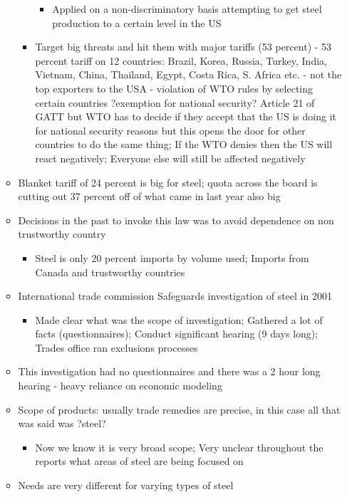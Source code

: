\documentclass[10pt]{article}
\begin{document}
\begin{itemize}
\begin{itemize}
\begin{itemize}
\begin{itemize}
  \item Applied on a non-discriminatory basis attempting to get steel production to a certain level in the US
\end{itemize}
\item Target big threats and hit them with major tariffs (53 percent) - 53 percent tariff on 12 countries: Brazil, Korea, Russia, Turkey, India, Vietnam, China, Thailand, Egypt, Costa Rica, S. Africa etc. - not the top exporters to the USA - violation of WTO rules by selecting certain countries ?exemption for national security? Article 21 of GATT but WTO has to decide if they accept that the US is doing it for national security reasons but this opens the door for other countries to do the same thing; If the WTO denies then the US will react negatively; Everyone else will still be affected negatively  
\end{itemize}  
  \item Blanket tariff of 24 percent is big for steel; quota across the board is cutting out 37 percent off of what came in last year also big
  \item Decisions in the past to invoke this law was to avoid dependence on non trustworthy country
  \begin{itemize}
    \item Steel is only 20 percent imports by volume used; Imports from Canada and trustworthy countries
  \end{itemize}
  \item International trade commission Safeguards investigation of steel in 2001 
\begin{itemize}
  \item Made clear what was the scope of investigation; Gathered a lot of facts (questionnaires); Conduct significant hearing (9 days long); Trades office ran exclusions processes
\end{itemize}
  \item This investigation had no questionnaires and there was a 2 hour long hearing - heavy reliance on economic modeling
  \item Scope of products: usually trade remedies are precise, in this case all that was said was ?steel? 
\begin{itemize}
  \item Now we know it is very broad scope; Very unclear throughout the reports what areas of steel are being focused on
\end{itemize}
  \item Needs are very different for varying types of steel

\end{itemize}
\end{itemize}
\end{document}
